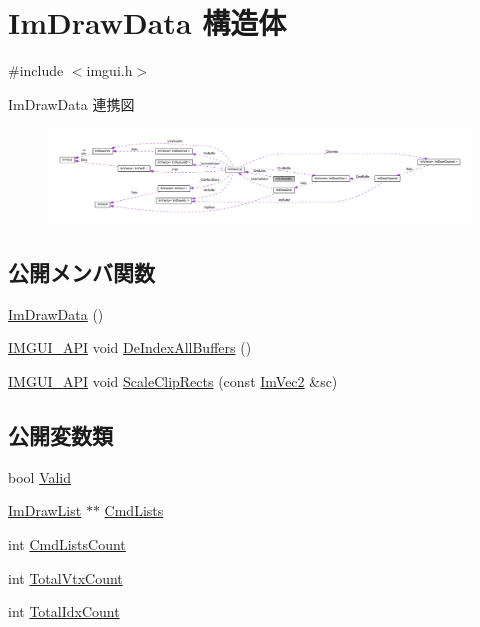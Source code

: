 \hypertarget{struct_im_draw_data}{}\section{Im\+Draw\+Data 構造体}
\label{struct_im_draw_data}


{\ttfamily \#include $<$imgui.\+h$>$}



Im\+Draw\+Data 連携図\nopagebreak
\begin{figure}[H]
\begin{center}
\leavevmode
\includegraphics[width=350pt]{struct_im_draw_data__coll__graph}
\end{center}
\end{figure}
\subsection*{公開メンバ関数}
\begin{DoxyCompactItemize}
\item 
\mbox{\hyperlink{struct_im_draw_data_a96b50c40107c997e9eea7ac3ba1a6138}{Im\+Draw\+Data}} ()
\item 
\mbox{\hyperlink{imgui_8h_a43829975e84e45d1149597467a14bbf5}{I\+M\+G\+U\+I\+\_\+\+A\+PI}} void \mbox{\hyperlink{struct_im_draw_data_a88ae746e958b79ee527fe94dee29d57c}{De\+Index\+All\+Buffers}} ()
\item 
\mbox{\hyperlink{imgui_8h_a43829975e84e45d1149597467a14bbf5}{I\+M\+G\+U\+I\+\_\+\+A\+PI}} void \mbox{\hyperlink{struct_im_draw_data_abbfb7f8351b436da654f93b6f103f0e2}{Scale\+Clip\+Rects}} (const \mbox{\hyperlink{struct_im_vec2}{Im\+Vec2}} \&sc)
\end{DoxyCompactItemize}
\subsection*{公開変数類}
\begin{DoxyCompactItemize}
\item 
bool \mbox{\hyperlink{struct_im_draw_data_ad01ab9ce5e8843b7860ccbb3eb9a6554}{Valid}}
\item 
\mbox{\hyperlink{struct_im_draw_list}{Im\+Draw\+List}} $\ast$$\ast$ \mbox{\hyperlink{struct_im_draw_data_a9e93fe7e620eb2e9f61e3b689d617edc}{Cmd\+Lists}}
\item 
int \mbox{\hyperlink{struct_im_draw_data_adc0bbc2881c15f78bdabe51d82582f4e}{Cmd\+Lists\+Count}}
\item 
int \mbox{\hyperlink{struct_im_draw_data_af0035b52cdf91932b25eaf2da853965a}{Total\+Vtx\+Count}}
\item 
int \mbox{\hyperlink{struct_im_draw_data_a1ac8a5d441f464628295ef91a0602fc5}{Total\+Idx\+Count}}
\end{DoxyCompactItemize}


